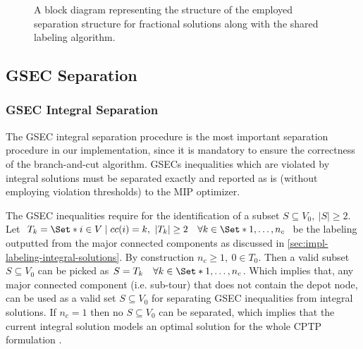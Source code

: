 \begin{figure}[ht]
	\centering
	\caption{A block diagram representing the structure
		of the employed separation structure for fractional solutions
		along with the shared labeling algorithm.
	}
	\label{fig:fractional-separation-block-diagram}
\end{figure}

\subsection{GSEC Separation}
\label{sec:impl-gsec-separation}

\subsubsection{GSEC Integral Separation}
\label{sec:impl-gsec-integral-separation}

The GSEC integral separation procedure is the most important
separation procedure in our implementation,
since it is mandatory to ensure the correctness of the branch-and-cut algorithm.
GSECs inequalities which are violated by integral solutions
must be separated exactly and reported as is
(without employing violation thresholds) to the MIP optimizer.

The GSEC inequalities require for the identification of a subset $S \subseteq V_0,\ |S| \ge 2$.
Let $T_k  = \Set*{i \in V \mid cc(i) = k},\ |T_k| \ge 2 \quad \forall k \in \Set*{1, \dots, n_c}$ be the labeling
outputted from the major connected components as discussed in \cref{sec:impl-labeling-integral-solutions}.
By construction $n_c \ge 1,\ 0 \in T_0$.
Then a valid subset $S \subseteq V_0$ can be picked as $S = T_k \quad \forall k \in \Set*{1, \dots, n_c}$.
Which implies that,
any major connected component (i.e. sub-tour) that does not contain the depot node,
can be used as a valid set $S \subseteq V_0$ for separating GSEC inequalities from integral solutions.
If $n_c = 1$ then no $S \subseteq V_0$ can be separated,
which implies that the current integral solution models an optimal solution for the whole CPTP formulation
.

